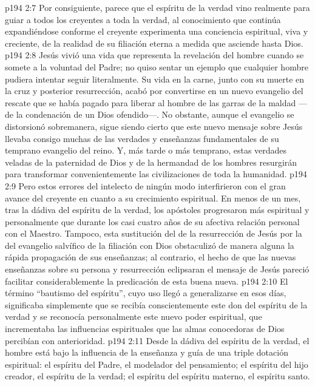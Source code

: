 \vs p194 2:7 Por consiguiente, parece que el espíritu de la verdad vino realmente para guiar a todos los creyentes a toda la verdad, al conocimiento que continúa expandiéndose conforme el creyente experimenta una conciencia espiritual, viva y creciente, de la realidad de su filiación eterna a medida que asciende hasta Dios.
\vs p194 2:8 \pc Jesús vivió una vida que representa la revelación del hombre cuando se somete a la voluntad del Padre; no quiso sentar un ejemplo que cualquier hombre pudiera intentar seguir literalmente. Su vida en la carne, junto con su muerte en la cruz y posterior resurrección, acabó por convertirse en un nuevo evangelio del rescate que se había pagado para liberar al hombre de las garras de la maldad ---de la condenación de un Dios ofendido---. No obstante, aunque el evangelio se distorsionó sobremanera, sigue siendo cierto que este nuevo mensaje sobre Jesús llevaba consigo muchas de las verdades y enseñanzas fundamentales de su temprano evangelio del reino. Y, más tarde o más temprano, estas verdades veladas de la paternidad de Dios y de la hermandad de los hombres resurgirán para transformar convenientemente las civilizaciones de toda la humanidad.
\vs p194 2:9 Pero estos errores del intelecto de ningún modo interfirieron con el gran avance del creyente en cuanto a su crecimiento espiritual. En menos de un mes, tras la dádiva del espíritu de la verdad, los apóstoles progresaron más espiritual y personalmente que durante los casi cuatro años de su afectiva relación personal con el Maestro. Tampoco, esta sustitución del  de la resurrección de Jesús por la  del evangelio salvífico de la filiación con Dios obstaculizó de manera alguna la rápida propagación de sus enseñanzas; al contrario, el hecho de que las nuevas enseñanzas sobre su persona y resurrección eclipsaran el mensaje de Jesús pareció facilitar considerablemente la predicación de esta buena nueva.
\vs p194 2:10 \pc El término “bautismo del espíritu”, cuyo uso llegó a generalizarse en esos días, significaba simplemente que se recibía conscientemente este don del espíritu de la verdad y se reconocía personalmente este nuevo poder espiritual, que incrementaba las influencias espirituales que las almas conocedoras de Dios percibían con anterioridad.
\vs p194 2:11 \pc Desde la dádiva del espíritu de la verdad, el hombre está bajo la influencia de la enseñanza y guía de una triple dotación espiritual: el espíritu del Padre, el modelador del pensamiento; el espíritu del hijo creador, el espíritu de la verdad; el espíritu del espíritu materno, el espíritu santo.
